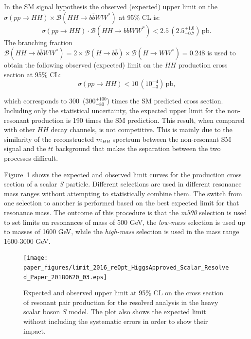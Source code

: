 In the SM signal hypothesis the observed (expected) upper
limit on the $\sigma(pp \to HH) \times {\mathcal{B}}( HH \to b\bar{b}WW^{\ast})$ at 95\%
CL is:
\[
\sigma(pp \to HH) \cdot {\mathcal{B}}(HH \to b\bar{b}WW^{\ast}) < 2.5 \, \left
 (2.5^{+1.0}_{-0.7} \right )  \,
{\mathrm{pb}}.
\]
The branching fraction ${\mathcal{B}}(HH \to b\bar{b}WW^{\ast}) = 2\times
{\mathcal{B}}(H \to b\bar{b}) \times {\mathcal{B}}(H \to WW^{\ast}) = 0.248$ is used to
obtain the following observed (expected) limit on the $HH$ production cross section at 95\% CL:
\[
\sigma(pp \to HH) < 10 \, \left (10^{+4}_{-3} \right) \,  {\text{pb,}}
\]
 
which corresponds to 300~(300$^{+100}_{-80}$) times the SM predicted cross section.
Including only the statistical uncertainty, the expected upper limit for the non-resonant production is
190 times the SM prediction.
This result, when compared with other $HH$ decay channels, is not competitive.  This is mainly  due to the similarity of the reconstructed $m_{HH}$ spectrum between the non-resonant SM signal
and the $t\bar{t}$ background that makes the separation between the
two processes difficult.
 
Figure~\ref{fig:limit} shows the expected and observed limit
curves for the production cross section of a scalar $S$ particle.
Different selections are used in different resonance mass ranges without attempting to statistically combine them. The
switch from one selection to another is performed based on the
best expected limit for that resonance mass.
The outcome of this procedure is that the \emph{m500} selection is used to set limits on resonances of mass of 500 GeV,  the \emph{low-mass}   selection is used up to masses of 1600 GeV, while the \emph{high-mass} selection is used in the mass range 1600-3000 GeV.
 
 
\begin{figure}[!h]
\begin{center}
\texttt{[image: paper\_figures/limit\_2016\_reOpt\_HiggsApproved\_Scalar\_Resolved\_Paper\_20180620\_03.eps]}
\caption[Expected and observed upper limit at 95\% CL on the cross section of resonant pair
         production for the resolved analysis in the heavy scalar boson $S$ model]{Expected and observed upper limit at 95\% CL on the cross section of resonant pair
         production for the resolved analysis in the heavy scalar boson $S$ model. The plot also shows the expected limit
         without including the systematic errors in order to show their impact.
          }
\label{fig:limit}
\end{center}
\end{figure}
 
